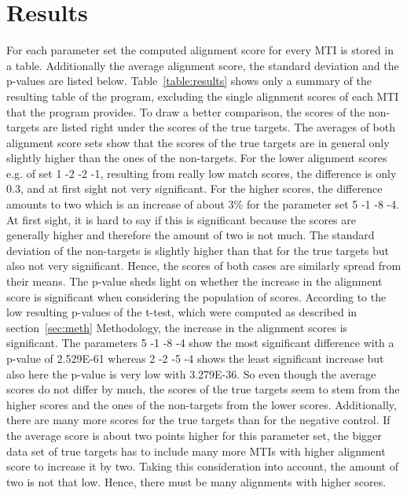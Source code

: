 \documentclass[12pt]{article}
\begin{document}
\section{Results}
For each parameter set the computed alignment score for every MTI is stored in a table. Additionally the average alignment score, the standard deviation and the p-values are listed below. Table~\ref{table:results} shows only a summary of the resulting table of the program, excluding the single alignment scores of each MTI that the program provides. To draw a better comparison, the scores of the non-targets are listed right under the scores of the true targets. The averages of both alignment score sets show that the scores of the true targets are in general only slightly higher than the ones of the non-targets. For the lower alignment scores e.g. of set 1 -2 -2 -1, resulting from really low match scores, the difference is only 0.3, and at first sight not very significant. For the higher scores, the difference amounts to two which is an increase of about 3\% for the parameter set 5 -1 -8 -4. At first sight, it is hard to say if this is significant because the scores are generally higher and therefore the amount of two is not much. 
The standard deviation of the non-targets is slightly higher than that for the true targets but also not very significant. Hence, the scores of both cases are similarly spread from their means. 
The p-value sheds light on whether the increase in the alignment score is significant when considering the population of scores. According to the low resulting p-values of the t-test, which were computed as described in section~\ref{sec:meth} Methodology, the increase in the alignment scores is significant. The parameters 5 -1 -8 -4 show the most significant difference with a p-value of 2.529E-61 whereas 2 -2 -5 -4 shows the least significant increase but also here the p-value is very low with 3.279E-36. So even though the average scores do not differ by much, the scores of the true targets seem to stem from the higher scores and the ones of the non-targets from the lower scores. Additionally, there are many more scores for the true targets than for the negative control. If the average score is about two points higher for this parameter set, the bigger data set of true targets has to include many more MTIs with higher alignment score to increase it by two. Taking this consideration into account, the amount of two is not that low. Hence, there must be many alignments with higher scores. 
\end{document}
